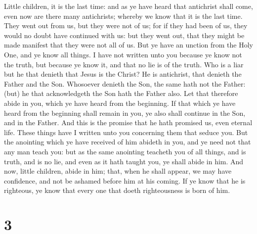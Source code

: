  Little children, it is the last time: and as ye have
heard that antichrist shall come, even now are there many antichrists;
whereby we know that it is the last time.  They went out
from us, but they were not of us; for if they had been of us, they would
no doubt have continued with us: but they went out, that they might be
made manifest that they were not all of us.  But ye have
an unction from the Holy One, and ye know all things.  I
have not written unto you because ye know not the truth, but because ye
know it, and that no lie is of the truth.  Who is a liar
but he that denieth that Jesus is the Christ? He is antichrist, that
denieth the Father and the Son.  Whosoever denieth the
Son, the same hath not the Father: (but) he that acknowledgeth the Son
hath the Father also.  Let that therefore abide in you,
which ye have heard from the beginning. If that which ye have heard from
the beginning shall remain in you, ye also shall continue in the Son,
and in the Father.  And this is the promise that he hath
promised us, even eternal life.  These things have I
written unto you concerning them that seduce you.  But
the anointing which ye have received of him abideth in you, and ye need
not that any man teach you: but as the same anointing teacheth you of
all things, and is truth, and is no lie, and even as it hath taught you,
ye shall abide in him.  And now, little children, abide
in him; that, when he shall appear, we may have confidence, and not be
ashamed before him at his coming.  If ye know that he is
righteous, ye know that every one that doeth righteousness is born of
him.

\hypertarget{section-2}{%
\section{3}\label{section-2}}

